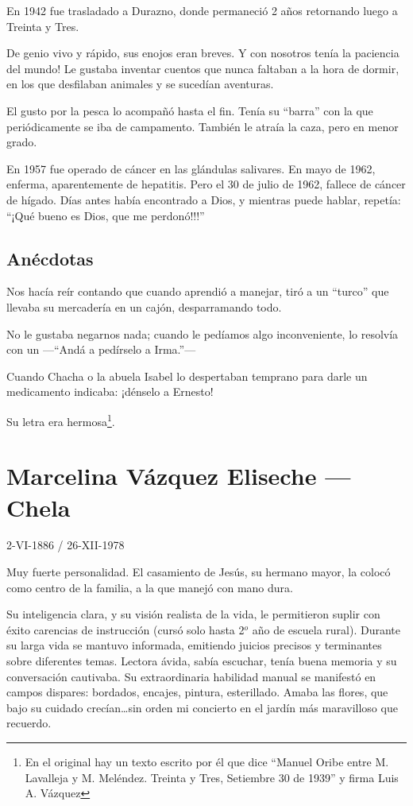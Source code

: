 \documentclass[a4paper]{article}
\begin{document}
En 1942 fue trasladado a Durazno, donde permaneció 2 años retornando luego a Treinta y Tres.

De genio vivo y rápido, sus enojos eran breves. Y con nosotros tenía la paciencia del mundo! Le gustaba inventar cuentos que nunca faltaban a la hora de dormir, en los que desfilaban animales y se sucedían aventuras.

El gusto por la pesca lo acompañó hasta el fin. Tenía su ``barra'' con la que periódicamente se iba de campamento. También le atraía la caza, pero en menor grado.

En 1957 fue operado de cáncer en las glándulas salivares. En mayo de 1962, enferma, aparentemente de hepatitis. Pero el 30 de julio de 1962, fallece de cáncer de hígado. Días antes había encontrado a Dios, y mientras puede hablar, repetía: ``¡Qué bueno es Dios, que me perdonó!!!''

\subsection{Anécdotas}

Nos hacía reír contando que cuando aprendió a manejar, tiró a un ``turco'' que llevaba su mercadería en un cajón, desparramando todo.

No le gustaba negarnos nada; cuando le pedíamos algo inconveniente, lo resolvía con un ---``Andá a pedírselo a Irma.''---

Cuando Chacha o la abuela Isabel lo despertaban temprano para darle un medicamento indicaba: ¡dénselo a Ernesto!

Su letra era hermosa\footnote{En el original hay un texto escrito por él que dice ``Manuel Oribe entre M. Lavalleja y M. Meléndez. Treinta y Tres, Setiembre 30 de 1939'' y firma Luis A. Vázquez}.

\section{Marcelina Vázquez Eliseche --- Chela}

2-VI-1886 / 26-XII-1978

\bigbreak{}

Muy fuerte personalidad. El casamiento de Jesús, su hermano mayor, la colocó como centro de la familia, a la que manejó con mano dura.

Su inteligencia clara, y su visión realista de la vida, le permitieron suplir con éxito carencias de instrucción (cursó solo hasta 2$^o$ año de escuela rural). Durante su larga vida se mantuvo informada, emitiendo juicios precisos y terminantes sobre diferentes temas. Lectora ávida, sabía escuchar, tenía buena memoria y su conversación cautivaba. Su extraordinaria habilidad manual se manifestó en campos dispares: bordados, encajes, pintura, esterillado. Amaba las flores, que bajo su cuidado crecían\ldots sin orden mi concierto en el jardín más maravilloso que recuerdo.
\end{document}
